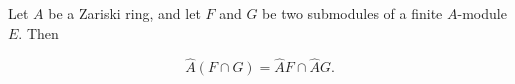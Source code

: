 Let $A$ be a Zariski ring, and let $F$ and $G$ be two submodules of a finite $A$-module $E$. Then

$$\hat{A}(F \cap G) = \hat{A}F \cap \hat{A}G.$$